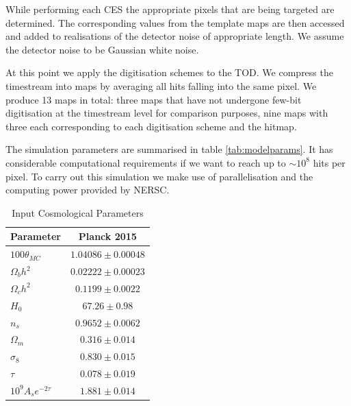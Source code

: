 \documentclass[apj]{emulateapj}
\begin{document}
While performing each CES the appropriate pixels that are being targeted are determined. The corresponding values from the template maps are then accessed and added to realisations of the detector noise of appropriate length. We assume the detector noise to be Gaussian white noise.

At this point we apply the digitisation schemes to the TOD. We compress the timestream into maps by averaging all hits falling into the same pixel. We produce 13 maps in total: three maps that have not undergone few-bit digitisation at the timestream level for comparison purposes, nine maps with three each corresponding to each digitisation scheme and the hitmap.

The simulation parameters are summarised in table \ref{tab:modelparams}. It has considerable computational requirements if we want to reach up to $\sim 10^8$ hits per pixel. To carry out this simulation we make use of parallelisation and the computing power provided by NERSC.

\begin{table}[tbh]
\begin{center}
\caption{\label{tab:inputcosparams} Input Cosmological Parameters}
\small
\begin{tabular}{l | c}
Parameter & Planck 2015\\
\hline
$100\theta_{MC}$ & $ 1.04086 \pm 0.00048$\\
$\Omega_b h^2$ & $  0.02222 \pm 0.00023$\\
$\Omega_c h^2$ & $ 0.1199 \pm 0.0022$\\
$H_0$ & $67.26 \pm 0.98$\\
$n_s$ & $0.9652 \pm 0.0062$\\
$\Omega_m$ & $0.316 \pm 0.014$\\
$\sigma_8$ & $0.830 \pm 0.015 $\\
$\tau$ & $0.078 \pm 0.019$\\
$10^9 A_s e^{-2\tau}$ & $1.881 \pm 0.014 $\\
\end{tabular}
 \normalsize
\end{center}
\end{table}
\end{document}
